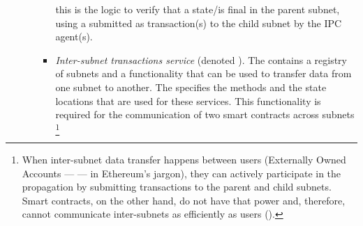 \begin{itemize}
\begin{enumerate}
\begin{itemize}
            this is the logic to verify that a state/\tx is final in the parent subnet,
            using a \pof submitted as transaction(s) to the child subnet by the IPC agent(s).
            \item \emph{Inter-subnet transactions service} (denoted \postoffice).
            The \gw contains a registry of subnets and a functionality that can be used to transfer data from one subnet to another. 
            The \postoffice specifies the methods and the state locations that are used for these services.
            This functionality is required for the communication of two smart contracts across subnets%
\footnote{When inter-subnet data transfer happens between users (Externally Owned Accounts --- \eoa --- in Ethereum's jargon), they can actively participate in the propagation by submitting transactions to the parent and child subnets. Smart contracts, on the other hand, do not have that power and, therefore, cannot communicate inter-subnets as efficiently as users (\eoa).}
        \end{itemize}
    \end{enumerate}
\end{itemize}

